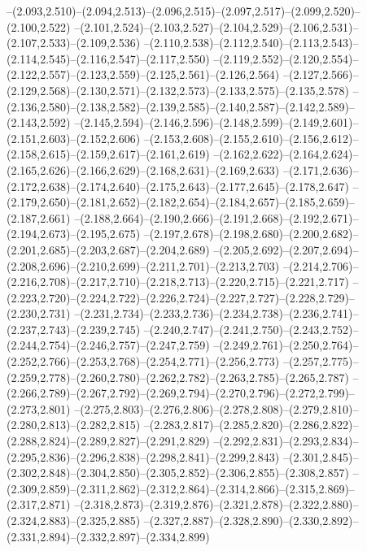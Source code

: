  --(2.093,2.510)--(2.094,2.513)--(2.096,2.515)--(2.097,2.517)--(2.099,2.520)--(2.100,2.522)%
  --(2.101,2.524)--(2.103,2.527)--(2.104,2.529)--(2.106,2.531)--(2.107,2.533)--(2.109,2.536)%
  --(2.110,2.538)--(2.112,2.540)--(2.113,2.543)--(2.114,2.545)--(2.116,2.547)--(2.117,2.550)%
  --(2.119,2.552)--(2.120,2.554)--(2.122,2.557)--(2.123,2.559)--(2.125,2.561)--(2.126,2.564)%
  --(2.127,2.566)--(2.129,2.568)--(2.130,2.571)--(2.132,2.573)--(2.133,2.575)--(2.135,2.578)%
  --(2.136,2.580)--(2.138,2.582)--(2.139,2.585)--(2.140,2.587)--(2.142,2.589)--(2.143,2.592)%
  --(2.145,2.594)--(2.146,2.596)--(2.148,2.599)--(2.149,2.601)--(2.151,2.603)--(2.152,2.606)%
  --(2.153,2.608)--(2.155,2.610)--(2.156,2.612)--(2.158,2.615)--(2.159,2.617)--(2.161,2.619)%
  --(2.162,2.622)--(2.164,2.624)--(2.165,2.626)--(2.166,2.629)--(2.168,2.631)--(2.169,2.633)%
  --(2.171,2.636)--(2.172,2.638)--(2.174,2.640)--(2.175,2.643)--(2.177,2.645)--(2.178,2.647)%
  --(2.179,2.650)--(2.181,2.652)--(2.182,2.654)--(2.184,2.657)--(2.185,2.659)--(2.187,2.661)%
  --(2.188,2.664)--(2.190,2.666)--(2.191,2.668)--(2.192,2.671)--(2.194,2.673)--(2.195,2.675)%
  --(2.197,2.678)--(2.198,2.680)--(2.200,2.682)--(2.201,2.685)--(2.203,2.687)--(2.204,2.689)%
  --(2.205,2.692)--(2.207,2.694)--(2.208,2.696)--(2.210,2.699)--(2.211,2.701)--(2.213,2.703)%
  --(2.214,2.706)--(2.216,2.708)--(2.217,2.710)--(2.218,2.713)--(2.220,2.715)--(2.221,2.717)%
  --(2.223,2.720)--(2.224,2.722)--(2.226,2.724)--(2.227,2.727)--(2.228,2.729)--(2.230,2.731)%
  --(2.231,2.734)--(2.233,2.736)--(2.234,2.738)--(2.236,2.741)--(2.237,2.743)--(2.239,2.745)%
  --(2.240,2.747)--(2.241,2.750)--(2.243,2.752)--(2.244,2.754)--(2.246,2.757)--(2.247,2.759)%
  --(2.249,2.761)--(2.250,2.764)--(2.252,2.766)--(2.253,2.768)--(2.254,2.771)--(2.256,2.773)%
  --(2.257,2.775)--(2.259,2.778)--(2.260,2.780)--(2.262,2.782)--(2.263,2.785)--(2.265,2.787)%
  --(2.266,2.789)--(2.267,2.792)--(2.269,2.794)--(2.270,2.796)--(2.272,2.799)--(2.273,2.801)%
  --(2.275,2.803)--(2.276,2.806)--(2.278,2.808)--(2.279,2.810)--(2.280,2.813)--(2.282,2.815)%
  --(2.283,2.817)--(2.285,2.820)--(2.286,2.822)--(2.288,2.824)--(2.289,2.827)--(2.291,2.829)%
  --(2.292,2.831)--(2.293,2.834)--(2.295,2.836)--(2.296,2.838)--(2.298,2.841)--(2.299,2.843)%
  --(2.301,2.845)--(2.302,2.848)--(2.304,2.850)--(2.305,2.852)--(2.306,2.855)--(2.308,2.857)%
  --(2.309,2.859)--(2.311,2.862)--(2.312,2.864)--(2.314,2.866)--(2.315,2.869)--(2.317,2.871)%
  --(2.318,2.873)--(2.319,2.876)--(2.321,2.878)--(2.322,2.880)--(2.324,2.883)--(2.325,2.885)%
  --(2.327,2.887)--(2.328,2.890)--(2.330,2.892)--(2.331,2.894)--(2.332,2.897)--(2.334,2.899)%

